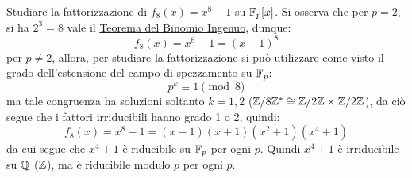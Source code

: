 \documentclass[11pt]{scrartcl}
\begin{document}
\begin{example}
	Studiare la fattorizzazione di $f_8(x) = x^8 - 1$ su ${\mathbb F}_p[x]$. Si osserva che per $p=2$, si ha $2^3=8$ vale il \hyperref[cf:bin]{Teorema del Binomio Ingenuo}, dunque:
		\[ f_8(x) = x^8 - 1 = (x-1)^8
			\]
		per $p \ne 2$, allora, per studiare la fattorizzazione si può utilizzare come visto il grado dell'estensione del campo di spezzamento su ${\mathbb F}_p$:
			\[p^k \equiv 1 \pmod 8
				\]
		ma tale congruenza ha soluzioni soltanto $k=1,2$ ($\mathbb{Z}/{8}\mathbb{Z}^* \cong \mathbb{Z}/{2}\mathbb{Z} \times \mathbb{Z}/{2}\mathbb{Z}$), da ciò segue che i fattori irriducibili hanno grado 1 o 2, quindi:
			\[ f_8(x) = x^8 - 1 = (x-1)(x+1)(x^2+1)(x^4+1)
				\]
		da cui segue che $x^4+1$ è riducibile su ${\mathbb F}_p$ per ogni $p$. Quindi $x^4 + 1$ è irriducibile su $\mathbb Q$ ($\mathbb Z$), ma è riducibile modulo $p$ per ogni $p$.
\end{example}
\end{document}
